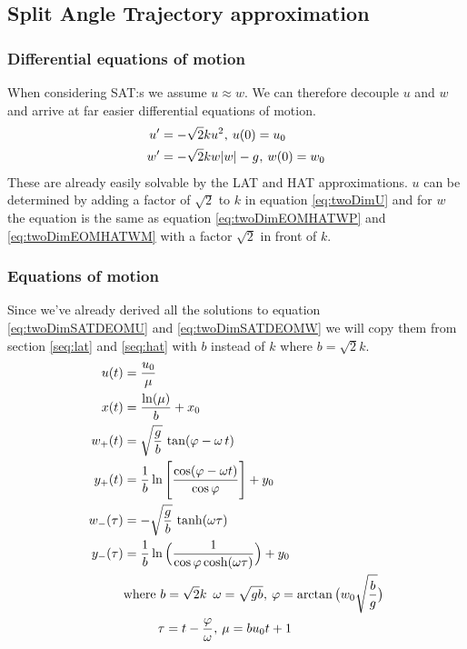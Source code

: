 \documentclass[%
aip,
jmp,
amsmath,amssymb,
reprint,%
]{revtex4-1}
\newcommand{\comma}{\hspace{0.1mm},\hspace{0.7mm}}
\begin{document}
	\subsection{Split Angle Trajectory approximation}
	\subsubsection{Differential equations of motion}
	When considering SAT:s we assume $u\approx w$. We can therefore decouple $u$ and $w$ and arrive at far easier differential equations of motion.
	\begin{align}\label{eq:twoDimSATDEOMU}
		u' &= -\sqrt{2}ku^2\comma u(0) = u_0\\\label{eq:twoDimSATDEOMW}
		w' &= -\sqrt{2}kw|w|-g\comma w(0) = w_0
	\end{align}
	These are already easily solvable by the LAT and HAT approximations. $u$ can be determined by adding a factor of $\sqrt{2}$ to $k$ in equation \eqref{eq:twoDimU} and for $w$ the equation is the same as equation \eqref{eq:twoDimEOMHATWP} and \eqref{eq:twoDimEOMHATWM} with a factor $\sqrt{2}$ in front of $k$.
	\subsubsection{Equations of motion}
	Since we've already derived all the solutions to equation \eqref{eq:twoDimSATDEOMU} and \eqref{eq:twoDimSATDEOMW} we will copy them from section \ref{seq:lat} and \ref{seq:hat} with $b$ instead of $k$ where $b = \sqrt{2}k$.
	\begin{align*}\nonumber
		u(t) &= \frac{u_0}{\mu}\\\nonumber
		x(t) &= \frac{\ln(\mu)}{b} + x_0\\\nonumber
		w_{+}(t) &= \sqrt{\frac{g}{b}}\,\tan(\varphi - \omega\,t)\\\nonumber
		y_{+}(t) &= \frac{1}{b}\ln\Bigg\lbrack\frac{\cos(\varphi-\omega t)}{\cos\varphi}\Bigg\rbrack+y_0\\\nonumber
		w_{-}(\tau) &= -\sqrt{\frac{g}{b}}\,\tanh(\omega\tau)\\\nonumber
		y_{-}(\tau) &= \frac{1}{b}\ln\Big(\frac{1}{\cos\varphi\cosh(\omega\tau)}\Big)+y_0\\\nonumber
		&\mathrm{where}\,\,b=\sqrt{2}k\,\,\,\omega = \sqrt{gb} \comma \varphi = \arctan\big(w_0\sqrt{\frac{b}{g}}\big)\\\nonumber
		&\hspace{9.5mm}\tau = t - \frac{\varphi}{\omega} \comma \mu = bu_0t+1
	\end{align*}
\end{document}
